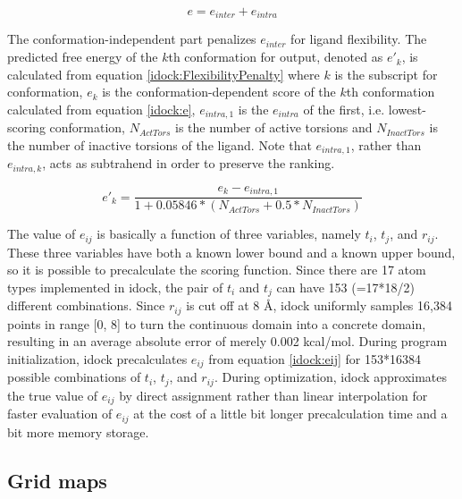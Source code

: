 \begin{equation}
\label{idock:inter-intra}
e = e_{inter} + e_{intra}
\end{equation}

The conformation-independent part penalizes $e_{inter}$ for ligand flexibility. The predicted free energy of the $k$th conformation for output, denoted as $e'_k$, is calculated from equation \eqref{idock:FlexibilityPenalty} where $k$ is the subscript for conformation, $e_k$ is the conformation-dependent score of the $k$th conformation calculated from equation \eqref{idock:e}, $e_{intra,1}$ is the $e_{intra}$ of the first, i.e. lowest-scoring conformation, $N_{ActTors}$ is the number of active torsions and $N_{InactTors}$ is the number of inactive torsions of the ligand. Note that $e_{intra,1}$, rather than $e_{intra,k}$, acts as subtrahend in order to preserve the ranking.

\begin{equation}
\label{idock:FlexibilityPenalty}
e'_k = \frac{e_k - e_{intra,1}}{1 + 0.05846 * (N_{ActTors} + 0.5 * N_{InactTors})}
\end{equation}

The value of $e_{ij}$ is basically a function of three variables, namely $t_i$, $t_j$, and $r_{ij}$. These three variables have both a known lower bound and a known upper bound, so it is possible to precalculate the scoring function. Since there are 17 atom types implemented in idock, the pair of $t_i$ and $t_j$ can have 153 (=17*18/2) different combinations. Since $r_{ij}$ is cut off at 8 \AA, idock uniformly samples 16,384 points in range [0, 8] to turn the continuous domain into a concrete domain, resulting in an average absolute error of merely 0.002 kcal/mol. During program initialization, idock precalculates $e_{ij}$ from equation \eqref{idock:eij} for 153*16384 possible combinations of $t_i$, $t_j$, and $r_{ij}$. During optimization, idock approximates the true value of $e_{ij}$ by direct assignment rather than linear interpolation for faster evaluation of $e_{ij}$ at the cost of a little bit longer precalculation time and a bit more memory storage.

\subsection{Grid maps}

